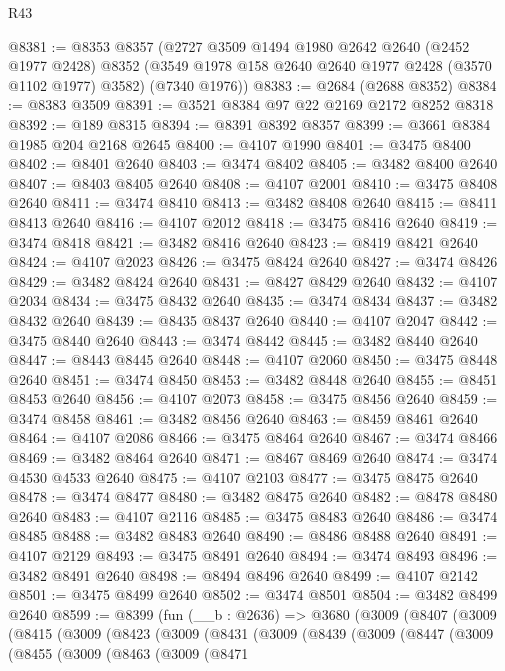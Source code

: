 \begin{lexlean}{R43}
\begin{coremodule}
@8381 := @8353
    @8357
    (@2727
      @3509
      @1494
      @1980
      @2642
      @2640
      (@2452 @1977 @2428)
      @8352
      (@3549 @1978 @158 @2640 @2640 @1977 @2428 (@3570 @1102 @1977) @3582)
      (@7340 @1976))
@8383 := @2684 (@2688 @8352)
@8384 := @8383 @3509
@8391 := @3521 @8384 @97 @22 @2169 @2172 @8252 @8318
@8392 := @189 @8315
@8394 := @8391 @8392 @8357
@8399 := @3661 @8384 @1985 @204 @2168 @2645
@8400 := @4107 @1990
@8401 := @3475 @8400
@8402 := @8401 @2640
@8403 := @3474 @8402
@8405 := @3482 @8400 @2640
@8407 := @8403 @8405 @2640
@8408 := @4107 @2001
@8410 := @3475 @8408 @2640
@8411 := @3474 @8410
@8413 := @3482 @8408 @2640
@8415 := @8411 @8413 @2640
@8416 := @4107 @2012
@8418 := @3475 @8416 @2640
@8419 := @3474 @8418
@8421 := @3482 @8416 @2640
@8423 := @8419 @8421 @2640
@8424 := @4107 @2023
@8426 := @3475 @8424 @2640
@8427 := @3474 @8426
@8429 := @3482 @8424 @2640
@8431 := @8427 @8429 @2640
@8432 := @4107 @2034
@8434 := @3475 @8432 @2640
@8435 := @3474 @8434
@8437 := @3482 @8432 @2640
@8439 := @8435 @8437 @2640
@8440 := @4107 @2047
@8442 := @3475 @8440 @2640
@8443 := @3474 @8442
@8445 := @3482 @8440 @2640
@8447 := @8443 @8445 @2640
@8448 := @4107 @2060
@8450 := @3475 @8448 @2640
@8451 := @3474 @8450
@8453 := @3482 @8448 @2640
@8455 := @8451 @8453 @2640
@8456 := @4107 @2073
@8458 := @3475 @8456 @2640
@8459 := @3474 @8458
@8461 := @3482 @8456 @2640
@8463 := @8459 @8461 @2640
@8464 := @4107 @2086
@8466 := @3475 @8464 @2640
@8467 := @3474 @8466
@8469 := @3482 @8464 @2640
@8471 := @8467 @8469 @2640
@8474 := @3474 @4530 @4533 @2640
@8475 := @4107 @2103
@8477 := @3475 @8475 @2640
@8478 := @3474 @8477
@8480 := @3482 @8475 @2640
@8482 := @8478 @8480 @2640
@8483 := @4107 @2116
@8485 := @3475 @8483 @2640
@8486 := @3474 @8485
@8488 := @3482 @8483 @2640
@8490 := @8486 @8488 @2640
@8491 := @4107 @2129
@8493 := @3475 @8491 @2640
@8494 := @3474 @8493
@8496 := @3482 @8491 @2640
@8498 := @8494 @8496 @2640
@8499 := @4107 @2142
@8501 := @3475 @8499 @2640
@8502 := @3474 @8501
@8504 := @3482 @8499 @2640
@8599 := @8399
    (fun (__b : @2636) =>
    @3680
      (@3009
        (@8407
          (@3009
            (@8415
              (@3009
                (@8423
                  (@3009
                    (@8431
                      (@3009
                        (@8439
                          (@3009
                            (@8447
                              (@3009
                                (@8455
                                  (@3009
                                    (@8463
                                      (@3009
                                        (@8471

\end{coremodule}
\end{lexlean}
